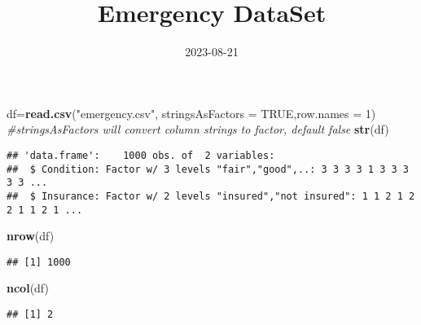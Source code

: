 \documentclass[
]{article}
\title{Emergency DataSet}
\author{}
\date{\vspace{-2.5em}2023-08-21}
\newenvironment{Shaded}{\begin{snugshade}}{\end{snugshade}}
\newcommand{\AttributeTok}[1]{\textcolor[rgb]{0.13,0.29,0.53}{#1}}
\newcommand{\CommentTok}[1]{\textcolor[rgb]{0.56,0.35,0.01}{\textit{#1}}}
\newcommand{\ConstantTok}[1]{\textcolor[rgb]{0.56,0.35,0.01}{#1}}
\newcommand{\DecValTok}[1]{\textcolor[rgb]{0.00,0.00,0.81}{#1}}
\newcommand{\FunctionTok}[1]{\textcolor[rgb]{0.13,0.29,0.53}{\textbf{#1}}}
\newcommand{\NormalTok}[1]{#1}
\newcommand{\OtherTok}[1]{\textcolor[rgb]{0.56,0.35,0.01}{#1}}
\newcommand{\SpecialCharTok}[1]{\textcolor[rgb]{0.81,0.36,0.00}{\textbf{#1}}}
\newcommand{\StringTok}[1]{\textcolor[rgb]{0.31,0.60,0.02}{#1}}
\begin{document}
\maketitle

\begin{Shaded}
\begin{Highlighting}[]
\NormalTok{df}\OtherTok{=}\FunctionTok{read.csv}\NormalTok{(}\StringTok{"emergency.csv"}\NormalTok{, }\AttributeTok{stringsAsFactors =} \ConstantTok{TRUE}\NormalTok{,}\AttributeTok{row.names =} \DecValTok{1}\NormalTok{)}
\CommentTok{\#stringsAsFactors will convert column strings to factor, default false}
\FunctionTok{str}\NormalTok{(df)}
\end{Highlighting}
\end{Shaded}

\begin{verbatim}
## 'data.frame':    1000 obs. of  2 variables:
##  $ Condition: Factor w/ 3 levels "fair","good",..: 3 3 3 3 1 3 3 3 3 3 ...
##  $ Insurance: Factor w/ 2 levels "insured","not insured": 1 1 2 1 2 2 1 1 2 1 ...
\end{verbatim}

\begin{Shaded}
\begin{Highlighting}[]
\FunctionTok{nrow}\NormalTok{(df)}
\end{Highlighting}
\end{Shaded}

\begin{verbatim}
## [1] 1000
\end{verbatim}

\begin{Shaded}
\begin{Highlighting}[]
\FunctionTok{ncol}\NormalTok{(df)}
\end{Highlighting}
\end{Shaded}

\begin{verbatim}
## [1] 2
\end{verbatim}

\begin{Shaded}
\end{Shaded}
\end{document}
